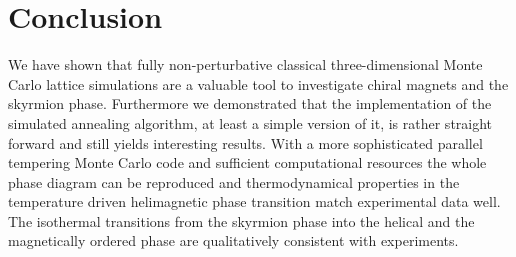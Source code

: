 %
\section{Conclusion}\label{sec:conclusion}
%
We have shown that fully non-perturbative classical three-dimensional Monte
Carlo lattice simulations are a valuable tool to investigate chiral magnets and
the skyrmion phase. Furthermore we demonstrated that the implementation of the
simulated annealing algorithm, at least a simple version of it, is rather
straight forward and still yields interesting results. With a more sophisticated
parallel tempering Monte Carlo code and sufficient computational resources the
whole phase diagram can be reproduced and thermodynamical properties in the
temperature driven helimagnetic phase transition match experimental data well.
The isothermal transitions from the skyrmion phase into the helical and the
magnetically ordered phase are qualitatively consistent with experiments.
